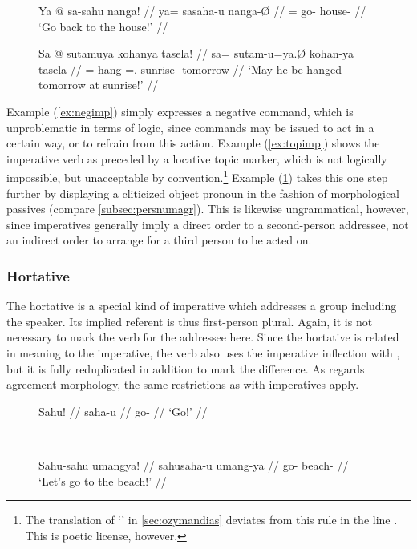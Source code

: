 \begin{figure}[h]
\pex\label{ex:agrimp}
\a\label{ex:topimp}\ljudge*\begingl
	\gla Ya @ sa-sahu nanga! //
	\glb ya= sa\til{}saha-u nanga-Ø //
	\glc \LocT{}= \Iter{}\til{}go-\Imp{} house-\Top{} //
	\glft `Go back to the house!' //
\endgl

\a\label{ex:persimp}\ljudge*\begingl
	\gla Sa @ sutamuya kohanya tasela! //
	\glb sa= sutam-u=ya.Ø kohan-ya tasela //
	\glc \PatT{}= hang-\Imp{}=\TsgM{}.\Top{} sunrise-\Loc{} tomorrow //
	\glft `May he be hanged tomorrow at sunrise!' //
\endgl
\xe
\end{figure}

Example (\ref{ex:negimp}) simply expresses a negative command, which is
unproblematic in terms of logic, since commands may be issued to act in a
certain way, or to refrain from this action. Example (\ref{ex:topimp}) shows
the imperative verb as preceded by a locative topic marker, which is not
logically impossible, but unacceptable by convention.\footnote{The translation
of `' in \autoref{sec:ozymandias} deviates from
this rule in the line . This is poetic license, however.} Example (\ref{ex:persimp})
takes this one step further by displaying a cliticized object pronoun in the
fashion of morphological passives (compare \autoref{subsec:persnumagr}). This
is likewise ungrammatical, however, since imperatives generally imply a direct
order to a second-person addressee, not an indirect order to arrange for a
third person to be acted on.


\subsubsection{Hortative}

The hortative is a special kind of imperative which addresses a group 
including the speaker. Its implied referent is thus first-person plural. 
Again, it is not necessary to mark the verb for the addressee here. Since 
the hortative is related in meaning to the imperative, the verb also uses the 
imperative inflection with , but it is fully reduplicated in 
addition to mark the difference. As regards agreement morphology, the same 
restrictions as with imperatives apply.

\begin{figure}[h]
\ex{}\label{ex:hortmorph}
\begin{minipage}[t]{.5\remaining}
\tl\quad\begingl
	\gla Sahu! //
	\glb saha-u //
	\glc go-\Imp{} //
	\glft `Go!' //
\endgl
\end{minipage}
~
\begin{minipage}[t]{.5\remaining}
\tl\quad\begingl
	\gla Sahu-sahu umangya! //
	\glb sahu\til{}saha-u umang-ya //
	\glc \Hort{}\til{}go-\Imp{} beach-\Loc{} //
	\glft `Let's go to the beach!' //
\endgl
\end{minipage}
\xe
\end{figure}

